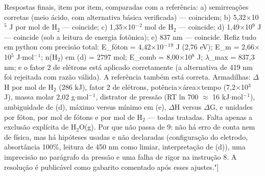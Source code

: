 \documentclass{article}%
\begin{document}
Respostas finais, item por item, comparadas com a referência: a) semirreações corretas (meio ácido, com alternativa básica verificada) --- coincidem; b) 5,32$\times$10$^{5}$ J por mol de H$_{2}$ --- coincide; c) 1,35$\times$10$^{-}$$^2$ mol de H$_{2}$ --- coincide; d) 1,49$\times$10$^{9}$ J --- coincide (sob a leitura de energia fotônica); e) 837 nm --- coincide. Refiz tudo em python com precisão total: E\_fóton = 4,42$\times$10$^{-}$$^{1}$$^{9}$ J (2,76 eV); E\_m = 2,66$\times$10$^{5}$ J$\cdot$mol$^{-}$$^{1}$; n(H$_{2}$) em (d) = 2797 mol; E\_comb = 8,00$\times$10$^{8}$ J; $\lambda$\_max = 837,3 nm; e o fator 2 de elétrons está aplicado corretamente (a alternativa de 419 nm foi rejeitada com razão válida). A referência também está correta. Armadilhas: $\Delta$H por mol de H$_{2}$ (286 kJ), fator 2 de elétrons, potência$\times$área$\times$tempo (7,2$\times$10$^3$ J), massa molar 2,02 g$\cdot$mol$^{-}$$^{1}$, distrator de pressão (RT ln 700 $\approx$ 16 kJ$\cdot$mol$^{-}$$^{1}$), ambiguidade de (d), máximo versus mínimo em (e), $\Delta$H versus $\Delta$G, e unidades por fóton, por mol de fótons e por mol de H$_{2}$ --- todas tratadas. Falta apenas a exclusão explícita de H$_{2}$O(g). Por que não passa de 9: não há erro de conta nem de física, mas há hipóteses usadas e não declaradas (configuração do eletrodo, absortância 100\%, leitura de 450 nm como limiar, interpretação de (d)), uma imprecisão no parágrafo da pressão e uma falha de rigor na instrução 8. A resolução é publicável como gabarito comentado após esses ajustes."{]}%
\end{document}
